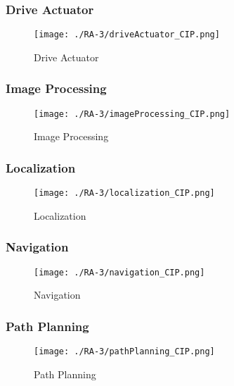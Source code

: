 \subsubsection{Drive Actuator} %
\begin{figure}[ht!]
 \centering
 \texttt{[image: ./RA-3/driveActuator\_CIP.png]}
 \caption{Drive Actuator}
 \label{fig:driveactuator_cip}
\end{figure}

\subsubsection{Image Processing} %
\begin{figure}[ht!]
 \centering
 \texttt{[image: ./RA-3/imageProcessing\_CIP.png]}
 \caption{Image Processing}
 \label{fig:imageprocessing_cip}
\end{figure}


\subsubsection{Localization} %
\begin{figure}[ht!]
 \centering
 \texttt{[image: ./RA-3/localization\_CIP.png]}
 \caption{Localization}
 \label{fig:localization_cip}
\end{figure}

\subsubsection{Navigation} %
\begin{figure}[ht!]
 \centering
 \texttt{[image: ./RA-3/navigation\_CIP.png]}
 \caption{Navigation}
 \label{fig:navigation_cip}
\end{figure}

\subsubsection{Path Planning} %
\begin{figure}[ht!]
 \centering
 \texttt{[image: ./RA-3/pathPlanning\_CIP.png]}
 \caption{Path Planning}
 \label{fig:pathplanning_cip}
\end{figure}

